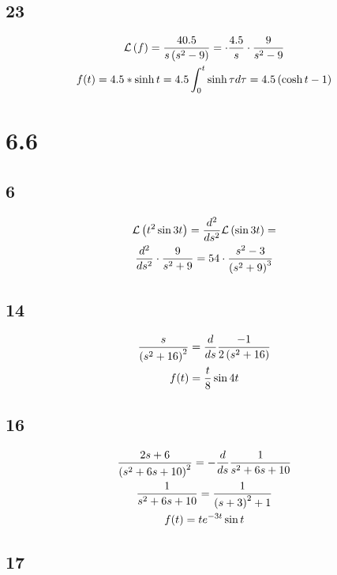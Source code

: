 \newpage


\subsection*{23}

\begin{gather*}
	\mathcal{L}\left( f \right) =
	\frac{40.5}{s \left( s^2 - 9 \right)} =
	\cdot \frac{4.5}{s} \cdot \frac{9}{s^2 - 9} \\
	f(t) = 4.5 * \sinh{t} =
	4.5 \int_0^t{\sinh{\tau} d\tau} =
	4.5 \left( \cosh{t} - 1 \right)
\end{gather*}


\section*{6.6}


\subsection*{6}


\begin{gather*}
	\mathcal{L}\left( t^2 \sin{3 t} \right)	=
	\frac{d^2}{ds^2} \mathcal{L}\left( \sin{3 t} \right) = \\
	\frac{d^2}{ds^2} \cdot \frac{9}{s^2 + 9} =
	54 \cdot \frac{s^2 - 3}{\left( s^2 + 9 \right)^3}
\end{gather*}


\subsection*{14}


\begin{gather*}
	\frac{s}{\left( s^2 + 16 \right)^2} =
	\frac{d}{ds} \frac{-1}{2 \left( s^2 + 16 \right)} \\
	f(t) = \frac{t}{8} \sin{4 t}
\end{gather*}


\subsection*{16}


\begin{gather*}
	\frac{2 s + 6}{\left( s^2 + 6 s + 10 \right)^2} = - \frac{d}{ds} \frac{1}{s^2 + 6 s + 10} \\
	\frac{1}{s^2 + 6 s + 10} =
	\frac{1}{\left( s + 3 \right)^2 + 1} \\
	f(t) = t e^{-3 t} \sin{t}
\end{gather*}


\subsection*{17}


